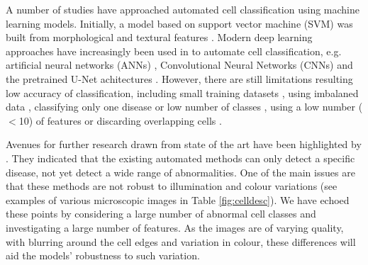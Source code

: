 \documentclass[final,5p,times,twocolumn,authoryear]{elsarticle}
\begin{document}
A number of studies have approached automated cell classification using machine learning models. Initially, a model based on support vector machine (SVM) was built from morphological and textural features \citep{Shirazi2018ExtremeClassification,Devi2018MalariaSmear}. Modern deep learning approaches have increasingly been used in to automate cell classification, e.g. artificial neural networks (ANNs) \citep{Tomari2014ComputerImage}, Convolutional Neural Networks (CNNs) \citep{Xu2017AAnemia,Durant2017VeryErythrocytes} and the pretrained U-Net achitectures \citep{Zhang2017ImageU-Net}. However, there are still limitations resulting low accuracy of classification, including small training datasets \citep{Devi2018MalariaSmear,Zhang2017ImageU-Net}, using imbalaned data \citep{Xu2017AAnemia,Durant2017VeryErythrocytes,Zhang2017ImageU-Net}, classifying only one disease or low number of classes \citep{Xu2017AAnemia,Zhang2017ImageU-Net,Devi2018MalariaSmear}, using a low number ($<$10) of features \citep{Tomari2014ComputerImage} or discarding overlapping cells  \citep{Durant2017VeryErythrocytes}.

Avenues for further research drawn from state of the art have been highlighted by \citet{Hegde2018PeripheralReview}. They indicated that the existing automated methods can only detect a specific disease, not yet detect a wide range of abnormalities. One of the main issues are that these methods are not robust to illumination and colour variations (see examples of various microscopic images in Table \ref{fig:celldesc}). We have echoed these points by considering a large number of abnormal cell classes and investigating a large number of features.  As the images are of varying quality, with blurring around the cell edges and variation in colour, these differences will aid the models' robustness to such variation. %
\end{document}
